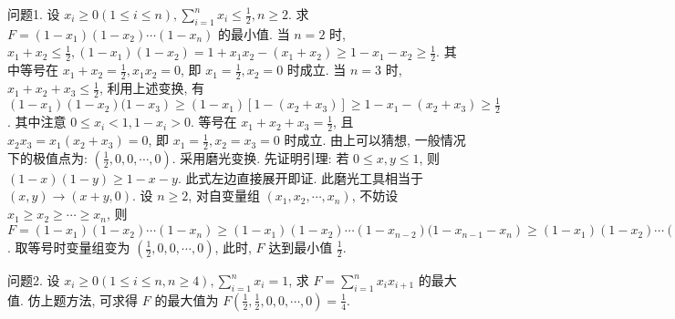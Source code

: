 
问题1. 设 $x_i \geqslant 0(1 \leqslant i \leqslant n), \sum_{i=1}^n x_i \leqslant \frac{1}{2}, n \geqslant 2$. 求 $F=\left(1-x_1\right)\left(1-x_2\right) \cdots\left(1-x_n\right)$ 的最小值.
当 $n=2$ 时, $x_1+x_2 \leqslant \frac{1}{2},\left(1-x_1\right)\left(1-x_2\right)=1+x_1 x_2-\left(x_1+x_2\right) \geqslant 1-x_1-x_2 \geqslant \frac{1}{2}$. 其中等号在 $x_1+x_2=\frac{1}{2}, x_1 x_2=0$, 即 $x_1=\frac{1}{2}, x_2=0$ 时成立.
当 $n=3$ 时, $x_1+x_2+x_3 \leqslant \frac{1}{2}$, 利用上述变换, 有 $\left(1-x_1\right)\left(1-x_2\right)(1- \left.x_3\right) \geqslant\left(1-x_1\right)\left[1-\left(x_2+x_3\right)\right] \geqslant 1-x_1-\left(x_2+x_3\right) \geqslant \frac{1}{2}$. 其中注意 $0 \leqslant x_i<1,1-x_i>0$. 等号在 $x_1+x_2+x_3=\frac{1}{2}$, 且 $x_2 x_3=x_1\left(x_2+x_3\right)=0$, 即 $x_1=\frac{1}{2}, x_2=x_3=0$ 时成立.
由上可以猜想, 一般情况下的极值点为:
$\left(\frac{1}{2}, 0,0, \cdots, 0\right)$. 采用磨光变换.
先证明引理: 若 $0 \leqslant x, y \leqslant 1$, 则 $(1- x)(1-y) \geqslant 1-x-y$. 此式左边直接展开即证.
此磨光工具相当于 $(x, y) \rightarrow (x+y, 0)$. 设 $n \geqslant 2$, 对自变量组 $\left(x_1, x_2, \cdots, x_n\right)$, 不妨设 $x_1 \geqslant x_2 \geqslant \cdots \geqslant x_n$, 则 $F=\left(1-x_1\right)\left(1-x_2\right) \cdots\left(1-x_n\right) \geqslant\left(1-x_1\right)\left(1-x_2\right) \cdots\left(1-x_{n-2}\right)(1- \left.x_{n-1}-x_n\right) \geqslant\left(1-x_1\right)\left(1-x_2\right) \cdots\left(1-x_{n-3}\right)\left(1-x_{n-2}-x_{n-1}-x_n\right) \geqslant \cdots \geqslant 1- x_1-x_2-\cdots-x_n \geqslant \frac{1}{2}$. 取等号时变量组变为 $\left(\frac{1}{2}, 0,0, \cdots, 0\right)$, 此时, $F$ 达到最小值 $\frac{1}{2}$.



问题2. 设 $x_i \geqslant 0(1 \leqslant i \leqslant n, n \geqslant 4), \sum_{i=1}^n x_i=1$, 求 $F=\sum_{i=1}^n x_i x_{i+1}$ 的最大值.
仿上题方法, 可求得 $F$ 的最大值为 $F\left(\frac{1}{2}, \frac{1}{2}, 0,0, \cdots, 0\right)=\frac{1}{4}$.




